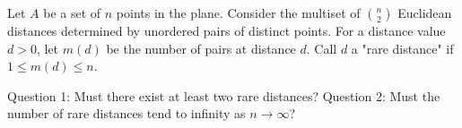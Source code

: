 Let $A$ be a set of $n$ points in the plane. Consider the multiset of $\binom{n}{2}$ Euclidean distances determined by unordered pairs of distinct points.
For a distance value $d>0$, let $m(d)$ be the number of pairs at distance $d$.
Call $d$ a "rare distance" if $1\le m(d)\le n$.

Question 1: Must there exist at least two rare distances?
Question 2: Must the number of rare distances tend to infinity as $n\to\infty$?

